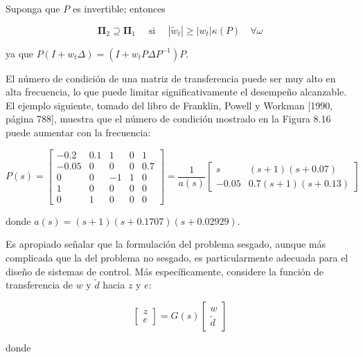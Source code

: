 
Suponga que $P$ es invertible; entonces

$$
\boldsymbol{\Pi}_{2} \supseteq \boldsymbol{\Pi}_{1} \quad \text { si } \quad\left|\tilde{w}_{t}\right| \geq\left|w_{t}\right| \kappa(P) \quad \forall \omega
$$

ya que $P\left(I+w_{t} \Delta\right)=\left(I+w_{t} P \Delta P^{-1}\right) P$.

El número de condición de una matriz de transferencia puede ser muy alto en alta frecuencia, lo que puede limitar significativamente el desempeño alcanzable. El ejemplo siguiente, tomado del libro de Franklin, Powell y Workman [1990, página 788], muestra que el número de condición mostrado en la Figura 8.16 puede aumentar con la frecuencia:

$$
P(s)=\left[\begin{array}{ccc|cc}
-0.2 & 0.1 & 1 & 0 & 1 \\
-0.05 & 0 & 0 & 0 & 0.7 \\
0 & 0 & -1 & 1 & 0 \\
\hline 1 & 0 & 0 & 0 & 0 \\
0 & 1 & 0 & 0 & 0
\end{array}\right]=\frac{1}{a(s)}\left[\begin{array}{cc}
s & (s+1)(s+0.07) \\
-0.05 & 0.7(s+1)(s+0.13)
\end{array}\right]
$$

donde $a(s)=(s+1)(s+0.1707)(s+0.02929)$.

Es apropiado señalar que la formulación del problema sesgado, aunque más complicada que la del problema no sesgado, es particularmente adecuada para el diseño de sistemas de control. Más específicamente, considere la función de transferencia de $w$ y $\tilde{d}$ hacia $z$ y $e$:

$$
\left[\begin{array}{l}
z \\
e
\end{array}\right]=G(s)\left[\begin{array}{l}
w \\
\tilde{d}
\end{array}\right]
$$

donde

